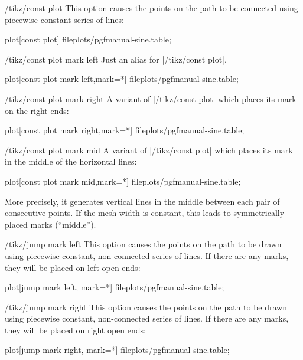\begin{key}{/tikz/const plot}
  This option causes the points on the path to be connected using
  piecewise constant series of lines: 

\begin{codeexample}[]
\tikz\draw plot[const plot] file{plots/pgfmanual-sine.table};
\end{codeexample}
\end{key}

\begin{key}{/tikz/const plot mark left}
  Just an alias for |/tikz/const plot|.
\begin{codeexample}[]
\tikz\draw plot[const plot mark left,mark=*] file{plots/pgfmanual-sine.table};
\end{codeexample}
\end{key}

\begin{key}{/tikz/const plot mark right}
  A variant of |/tikz/const plot| which places its mark on the right ends:
\begin{codeexample}[]
\tikz\draw plot[const plot mark right,mark=*] file{plots/pgfmanual-sine.table};
\end{codeexample}
\end{key}

\begin{key}{/tikz/const plot mark mid}
  A variant of |/tikz/const plot| which places its mark in the middle
  of the horizontal lines: 
\begin{codeexample}[]
\tikz\draw plot[const plot mark mid,mark=*] file{plots/pgfmanual-sine.table};
\end{codeexample}
  More precisely, it generates vertical lines in the middle between
  each pair of consecutive points. If the mesh width is constant, this
  leads to symmetrically placed marks (``middle''). 
\end{key}


\begin{key}{/tikz/jump mark left}
  This option causes the points on the path to be drawn using
  piecewise constant, non-connected series of lines. If there are any
  marks, they will be placed on left open ends: 

\begin{codeexample}[]
\tikz\draw plot[jump mark left, mark=*] file{plots/pgfmanual-sine.table};
\end{codeexample}
\end{key}

\begin{key}{/tikz/jump mark right}
  This option causes the points on the path to be drawn using
  piecewise constant, non-connected series of lines. If there are any
  marks, they will be placed on right open ends: 

\begin{codeexample}[]
\tikz\draw plot[jump mark right, mark=*] file{plots/pgfmanual-sine.table};
\end{codeexample}
\end{key}

